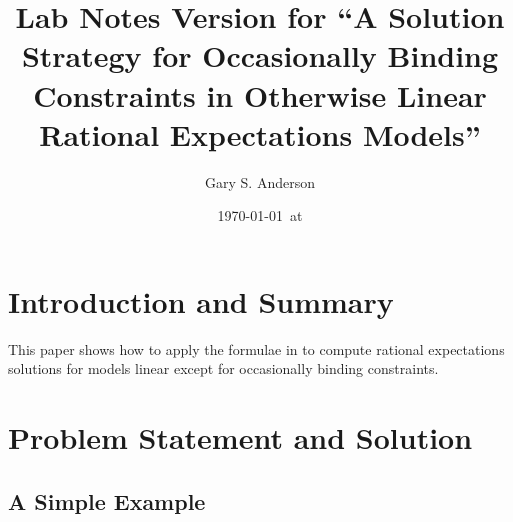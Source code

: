 \documentclass[12pt]{article}
\title{Lab Notes Version for ``A Solution Strategy for Occasionally Binding Constraints in Otherwise
Linear Rational Expectations Models''}
\author{Gary S. Anderson}
\date{\today \   at \currenttime}
\begin{document}
\maketitle




\section{Introduction and Summary}
\label{sec:introduction-summary}

This paper shows how to apply the formulae in\citep{anderson10} to compute 
rational expectations solutions for models linear except for occasionally binding constraints.

\section{Problem Statement and Solution}
\label{sec:probl-stat-solut}








\subsection{A Simple Example}
\label{sec:simple-example}


\makeatletter
\newcommand*\ExpandableInput[1]{\@@input#1 }
\makeatother
\end{document}
